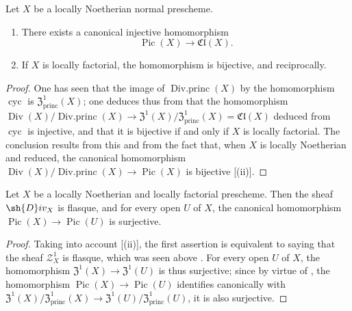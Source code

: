 \begin{corollary}[21.6.10]
\label{IV.21.6.10}
Let $X$ be a locally Noetherian normal prescheme.
\begin{enumerate}[label=\emph{(\roman*)}]
  \item There exists a canonical injective homomorphism
  \[
  \label{IV.21.6.10.1}
    \operatorname{Pic}(X)\to\mathfrak{Cl}(X).
    \tag{21.6.10.1}
  \]
  \item If $X$ is locally factorial, the homomorphism  is bijective, and reciprocally.
\end{enumerate}
\end{corollary}

\begin{proof}
One has seen  that the image of $\operatorname{Div.princ}(X)$ by the homomorphism $\operatorname{cyc}$ is $\mathfrak{Z}^1_{\mathrm{princ}}(X)$;
one deduces thus from  that the homomorphism $\operatorname{Div}(X)/\operatorname{Div.princ}(X)\to\mathfrak{Z}^1(X)/\mathfrak{Z}^1_{\mathrm{princ}}(X)=\mathfrak{Cl}(X)$ deduced from $\operatorname{cyc}$ is injective, and that it is bijective if and only if $X$ is locally factorial.
The conclusion results from this and from the fact that, when $X$ is locally Noetherian and reduced, the canonical homomorphism $\operatorname{Div}(X)/\operatorname{Div.princ}(X)\to\operatorname{Pic}(X)$  is bijective [(ii)].
\end{proof}

\begin{corollary}[21.6.11]
\label{IV.21.6.11}
Let $X$ be a locally Noetherian and locally factorial prescheme.
Then the sheaf $\sh{D}iv_X$ is flasque, and for every open $U$ of $X$, the canonical homomorphism $\operatorname{Pic}(X)\to\operatorname{Pic}(U)$ is surjective.
\end{corollary}

\begin{proof}
Taking into account [(ii)], the first assertion is equivalent to saying that the sheaf $\mathscr{Z}_X^1$ is flasque, which was seen above .
For every open $U$ of $X$, the homomorphism $\mathfrak{Z}^1(X)\to\mathfrak{Z}^1(U)$ is thus surjective;
since by virtue of , the homomorphism $\operatorname{Pic}(X)\to\operatorname{Pic}(U)$ identifies canonically with $\mathfrak{Z}^1(X)/\mathfrak{Z}^1_{\mathrm{princ}}(X)\to\mathfrak{Z}^1(U)/\mathfrak{Z}^1_{\mathrm{princ}}(U)$, it is also surjective.
\end{proof}

